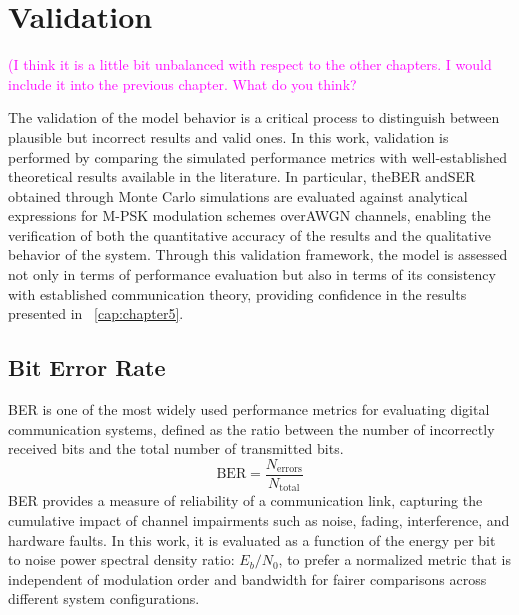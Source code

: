 
\chapter{Validation}
\label{cap:chapter4}

\textcolor{magenta}{(I think it is a little bit unbalanced with respect to the other chapters. I would include it into the previous chapter. What do you think?}

The validation of the model behavior is a critical process to distinguish between plausible but incorrect results and valid ones.
In this work, validation is performed by comparing the simulated performance metrics with well-established theoretical results available in the literature. In particular, the\gls{BER} and\gls{SER} obtained through Monte Carlo simulations are evaluated against analytical expressions for M-\gls{PSK} modulation schemes over\gls{AWGN} channels, enabling the verification of both the quantitative accuracy of the results and the qualitative behavior of the system.
Through this validation framework, the model is assessed not only in terms of performance evaluation but also in terms of its consistency with established communication theory, providing confidence in the results presented in \chaptername~\ref{cap:chapter5}.

\section{Bit Error Rate}
\label{sec:ber}

\gls{BER} is one of the most widely used performance metrics for evaluating digital communication systems, defined as the ratio between the number of incorrectly received bits and the total number of transmitted bits.
\begin{equation}
    \label{eq:ber_definition}
    \text{BER} = \frac{N_{\text{errors}}}{N_{\text{total}}}
\end{equation}
\gls{BER} provides a measure of reliability of a communication link, capturing the cumulative impact of channel impairments such as noise, fading, interference, and hardware faults. In this work, it is evaluated as a function of the energy per bit to noise power spectral density ratio: $E_b/N_0$, to prefer a normalized metric that is independent of modulation order and bandwidth for fairer comparisons across different system configurations.

